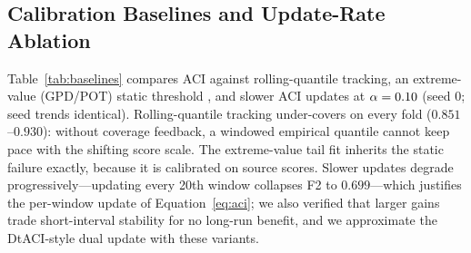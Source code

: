 \begin{table}[t]
\caption{F4 by fault class at $\alphaNom{=}0.10$ (mean of 3 seeds): AUROC against F4 normals, detection rate under ACI and NA-ACI ($\kappa{=}3$). CWRU class tags are catalog-indicative. NA-ACI recovers seven of eight CWRU records; record 185 and the Paderborn late-life windows recover partially.}
\label{tab:type}
\centering
\small
{}
\end{table}

\subsection{Calibration Baselines and Update-Rate Ablation}
\label{sec:variants}
Table~\ref{tab:baselines} compares ACI against rolling-quantile tracking, an extreme-value (GPD/POT) static threshold \cite{siffer2017}, and slower ACI updates at $\alpha=0.10$ (seed 0; seed trends identical). Rolling-quantile tracking under-covers on every fold ($0.851$--$0.930$): without coverage feedback, a windowed empirical quantile cannot keep pace with the shifting score scale. The extreme-value tail fit inherits the static failure exactly, because it is calibrated on source scores. Slower updates degrade progressively---updating every 20th window collapses F2 to $0.699$---which justifies the per-window update of Equation~\ref{eq:aci}; we also verified that larger gains trade short-interval stability for no long-run benefit, and we approximate the DtACI-style dual update \cite{dtaci2022} with these variants.

